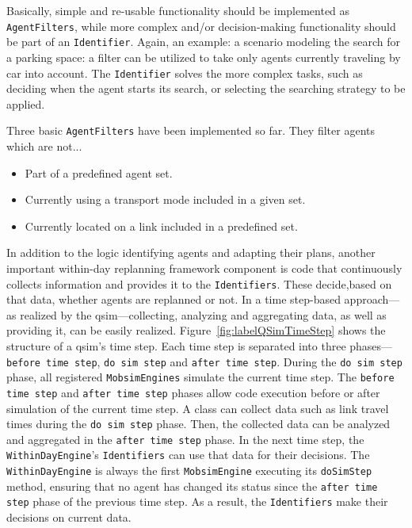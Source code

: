 Basically, simple and re-usable functionality should be implemented as \lstinline{AgentFilters}, while more complex and/or decision-making functionality should be part of an \lstinline{Identifier}. Again, an example: \eg a scenario modeling the search for a parking space: a filter can be utilized to take only agents currently traveling by car into account. The \lstinline{Identifier} solves the more complex tasks, such as deciding when the agent starts its search, or selecting the searching strategy to be applied.
%

Three basic \lstinline{AgentFilters} have been implemented so far. They filter agents which are not...
\begin{itemize}\styleItemize
    \item Part of a predefined agent set.
    \item Currently using a transport mode included in a given set.
    \item Currently located on a link included in a predefined set.
\end{itemize}
%

In addition to the logic identifying agents and adapting their plans, another important within-day replanning framework component is code that continuously collects information and provides it to the \lstinline{Identifiers}. These decide,based on that data, whether agents are replanned or not. In a time step-based approach---as realized by the \gls{qsim}---collecting, analyzing and aggregating data, as well as providing it, can be easily realized. Figure~\ref{fig:labelQSimTimeStep} shows the structure of a \gls{qsim}'s time step. Each time step is separated into three phases---\lstinline{before time step}, \lstinline{do sim step} and \lstinline{after time step}. During the \lstinline{do sim step} phase, all registered \lstinline{MobsimEngines} simulate the current time step. The \lstinline{before time step} and \lstinline{after time step} phases allow code execution before or after simulation of the current time step. A class can collect data such as link travel times during the \lstinline{do sim step} phase. Then, the collected data can be analyzed and aggregated in the \lstinline{after time step} phase. In the next time step, the \lstinline{WithinDayEngine}'s \lstinline{Identifiers} can use that data for their decisions. The \lstinline{WithinDayEngine} is always the first \lstinline{MobsimEngine} executing its \lstinline{doSimStep} method, ensuring that no agent has changed its status since the \lstinline{after time step} phase of the previous time step. As a result, the \lstinline{Identifiers} make their decisions on %
current data.

